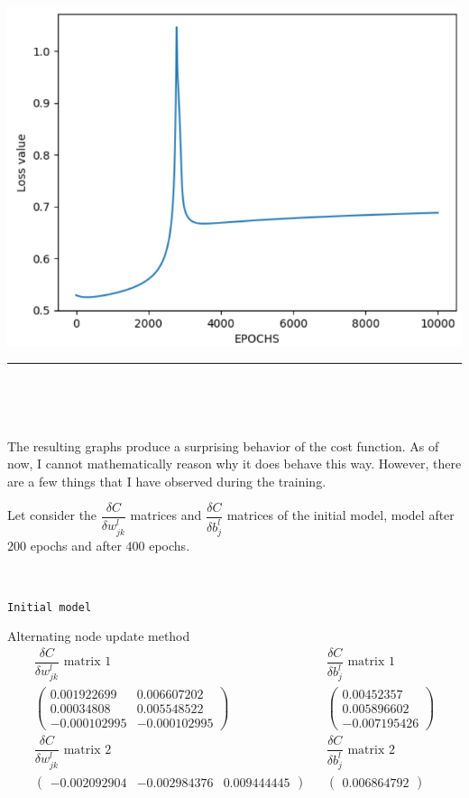 \documentclass[12pt,english,]{article}
\newcommand{\mtx}[1]{\begin{pmatrix}#1\end{pmatrix}} %
\newcommand{\code}[1]{\colorbox{light-gray}{\texttt{#1}}}
\let\origfigure\figure
\let\endorigfigure\endfigure
\renewenvironment{figure}[1][2] {
    \expandafter\origfigure\expandafter[H]
} {
    \endorigfigure
}
\begin{document}
\begin{figure}

{\centering \includegraphics[width=0.7\linewidth]{images/10k_graph} 

}

\caption{\label{fig6:figs}The graph of cost function after $10 000$ epochs trained with alternating node update method.}\label{fig:unnamed-chunk-6}
\end{figure}

\hrule

~

~

\newpage

The resulting graphs produce a surprising behavior of the cost function. As of now, I cannot mathematically reason why it does behave this way. However, there are a few things that I have observed during the training.

Let consider the $\dfrac{\delta C}{\delta w_{jk}^{l}}$ matrices and $\dfrac{\delta C}{\delta b_{j}^{l}}$ matrices of the initial model, model after $200$ epochs and after $400$ epochs.

~

\code{Initial model}

Alternating node update method
\begin{align*}
\text{$\dfrac{\delta C}{\delta w_{jk}^{l}}$ matrix 1} &&\text{$\dfrac{\delta C}{\delta b_{j}^{l}}$ matrix 1}\\
\mtx{0.001922699 & 0.006607202\\  0.00034808 & 0.005548522 \\ -0.000102995 & -0.000102995} &&\mtx{0.00452357 \\ 0.005896602 \\ -0.007195426 }\\
\text{$\dfrac{\delta C}{\delta w_{jk}^{l}}$ matrix 2} &&\text{$\dfrac{\delta C}{\delta b_{j}^{l}}$ matrix 2}\\
\mtx{-0.002092904 & -0.002984376 &  0.009444445} &&\mtx{0.006864792}\\
\end{align*}
\end{document}
